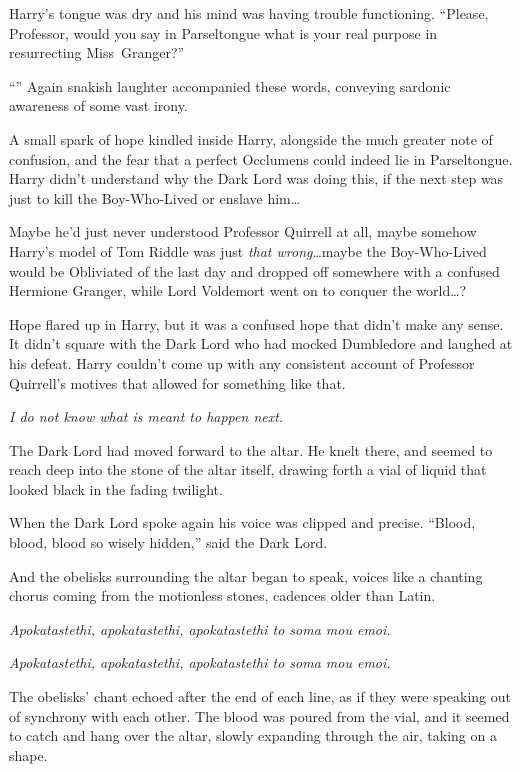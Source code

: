 Harry’s tongue was dry and his mind was having trouble functioning. “Please, Professor, would you say in Parseltongue what is your real purpose in resurrecting Miss~Granger?”

“” Again snakish laughter accompanied these words, conveying sardonic awareness of some vast irony.

A small spark of hope kindled inside Harry, alongside the much greater note of confusion, and the fear that a perfect Occlumens could indeed lie in Parseltongue. Harry didn’t understand why the Dark Lord was doing this, if the next step was just to kill the Boy-Who-Lived or enslave him…

Maybe he’d just never understood Professor Quirrell at all, maybe somehow Harry’s model of Tom Riddle was just \emph{that wrong}…maybe the Boy-Who-Lived would be Obliviated of the last day and dropped off somewhere with a confused Hermione Granger, while Lord Voldemort went on to conquer the world…?

Hope flared up in Harry, but it was a confused hope that didn’t make any sense. It didn’t square with the Dark Lord who had mocked Dumbledore and laughed at his defeat. Harry couldn’t come up with any consistent account of Professor Quirrell’s motives that allowed for something like that.

\emph{I do not know what is meant to happen next.}

The Dark Lord had moved forward to the altar. He knelt there, and seemed to reach deep into the stone of the altar itself, drawing forth a vial of liquid that looked black in the fading twilight.

When the Dark Lord spoke again his voice was clipped and precise. “Blood, blood, blood so wisely hidden,” said the Dark Lord.

And the obelisks surrounding the altar began to speak, voices like a chanting chorus coming from the motionless stones, cadences older than Latin.

\emph{Apokatastethi, apokatastethi, apokatastethi to soma mou emoi.}

\emph{Apokatastethi, apokatastethi, apokatastethi to soma mou emoi.}

The obelisks’ chant echoed after the end of each line, as if they were speaking out of synchrony with each other. The blood was poured from the vial, and it seemed to catch and hang over the altar, slowly expanding through the air, taking on a shape.

